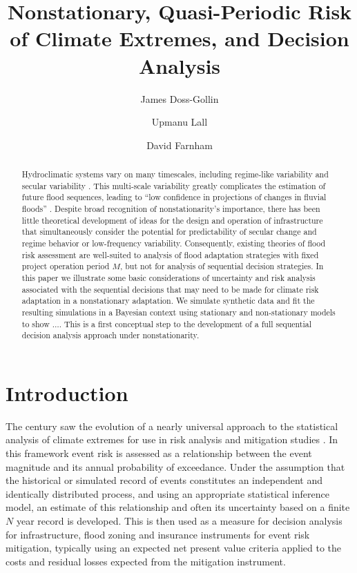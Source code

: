 \documentclass[12pt]{article}
\title{Nonstationary, Quasi-Periodic Risk of Climate Extremes, and Decision Analysis}
\author[1,2]{James Doss-Gollin}
\author[1,2]{Upmanu Lall}
\author[1,2]{David Farnham}
\affil[1]{Columbia Water Center, Columbia University}
\affil[2]{Department of Earth and Environmental Engineering, Columbia University}
\begin{document}
\maketitle
\RaggedRight{}
\begin{abstract}
  Hydroclimatic systems vary on many timescales, including regime-like variability and secular variability  \citep[``nonstationarity'';][]{Milly2008,Merz2014,Hodgkins2017}.
  This multi-scale variability greatly complicates the estimation of future flood sequences, leading to ``low confidence in projections of changes in fluvial floods'' \citep{IPCC2012}.
  Despite broad recognition of nonstationarity's importance, there has been little theoretical development of ideas for the design and operation of infrastructure that simultaneously consider the potential for predictability of secular change and regime behavior or low-frequency variability.
  Consequently, existing theories of flood risk assessment are well-suited to analysis of flood adaptation strategies with fixed project operation period \(M\), but not for analysis of sequential decision strategies.
  In this paper we illustrate some basic considerations of uncertainty and risk analysis associated with the sequential decisions that may need to be made for climate risk adaptation in a nonstationary adaptation.
  We simulate synthetic data and fit the resulting simulations in a Bayesian context using stationary and non-stationary models to show \(\ldots{}\).
  This is a first conceptual step to the development of a full sequential decision analysis approach under nonstationarity.
\end{abstract}

\section{Introduction}

The  century saw the evolution of a nearly universal approach to the statistical analysis of climate extremes for use in risk analysis and mitigation studies \citep[\ie{} Bulletin 17-B for flood frequency analysis;][]{IACWD1982}.
In this framework event risk is assessed as a relationship between the event magnitude and its annual probability of exceedance.
Under the assumption that the historical or simulated record of events constitutes an independent and identically distributed process, and using an appropriate statistical inference model, an estimate of this relationship and often its uncertainty based on a finite \(N\) year record is developed.
This is then used as a measure for decision analysis for infrastructure, flood zoning and insurance instruments for event risk mitigation, typically using an expected net present value criteria applied to the costs and residual losses expected from the mitigation instrument.
\end{document}

